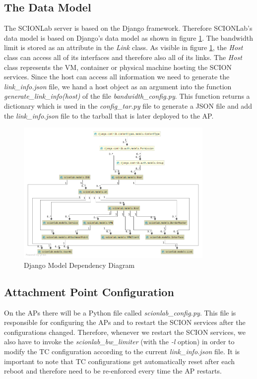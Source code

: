 \newpage
\subsection{The Data Model}

The \acs{SCIONLab} server is based on the Django framework. Therefore \acs{SCIONLab}'s data model is based on Django's data model as shown in figure \ref{Django Model Dependency Diagram}. The bandwidth limit is stored as an attribute in the \textit{Link} class. As visible in figure \ref{Django Model Dependency Diagram}, the \textit{Host} class can access all of its interfaces and therefore also all of its links. The \textit{Host} class represents the \acs{VM}, container or physical machine hosting the \acs{SCION} services. Since the host can access all information we need to generate the \textit{link\_info.json} file, we hand a host object as an argument into the function \textit{generate\_link\_info(host)} of the file \textit{bandwidth\_config.py}. This function returns a dictionary which is used in the \textit{config\_tar.py} file to generate a \acs{JSON} file and add the \textit{link\_info.json} file to the tarball that is later deployed to the \acl{AP}.

\begin{figure}[H]
	\centering
	\includegraphics[width=0.85\textwidth]{img/Django_diagram.png}
	\caption{Django Model Dependency Diagram}
	\label{Django Model Dependency Diagram}
\end{figure}

\subsection{Attachment Point Configuration}

On the \aclp{AP} there will be a Python file called \textit{scionlab\_config.py}. This file is responsible for configuring the \acsp{AP} and to restart the \acs{SCION} services after the configurations changed. Therefore, whenever we restart the \acs{SCION} services, we also have to invoke the \textit{scionlab\_bw\_limiter} (with the \textit{-l} option) in order to modify the \acs{TC} configuration according to the current \textit{link\_info.json} file. It is important to note that \acs{TC} configurations get automatically reset after each reboot and therefore need to be re-enforced every time the \acs{AP} restarts.

